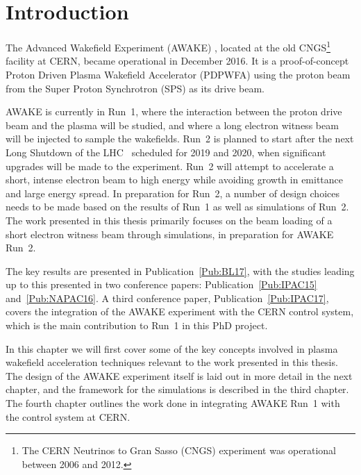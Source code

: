 %
%

\chapter{Introduction}
\label{Ch:Intro}

The Advanced Wakefield Experiment (AWAKE) \cite{awake_collaboration:2014}, located at the old CNGS\footnote{The CERN Neutrinos to Gran Sasso (CNGS) experiment was operational between 2006 and 2012.} facility at CERN, became operational in December 2016. It is a proof-of-concept Proton Driven Plasma Wakefield Accelerator (PDPWFA) using the proton beam from the Super Proton Synchrotron (SPS) as its drive beam.

AWAKE is currently in Run~1, where the interaction between the proton drive beam and the plasma will be studied, and where a long electron witness beam will be injected to sample the wakefields. Run~2 is planned to start after the next Long Shutdown of the LHC~\cite{bernardini:2016} scheduled for 2019 and 2020, when significant upgrades will be made to the experiment. Run~2 will attempt to accelerate a short, intense electron beam to high energy while avoiding growth in emittance and large energy spread. In preparation for Run~2, a number of design choices needs to be made based on the results of Run~1 as well as simulations of Run~2. The work presented in this thesis primarily focuses on the beam loading of a short electron witness beam through simulations, in preparation for AWAKE Run~2.

The key results are presented in Publication~\ref{Pub:BL17}, with the studies leading up to this presented in two conference papers: Publication~\ref{Pub:IPAC15} and~\ref{Pub:NAPAC16}. A third conference paper, Publication~\ref{Pub:IPAC17}, covers the integration of the AWAKE experiment with the CERN control system, which is the main contribution to Run~1 in this PhD project.

In this chapter we will first cover some of the key concepts involved in plasma wakefield acceleration techniques relevant to the work presented in this thesis. The design of the AWAKE experiment itself is laid out in more detail in the next chapter, and the framework for the simulations is described in the third chapter. The fourth chapter outlines the work done in integrating AWAKE Run~1 with the control system at CERN.

